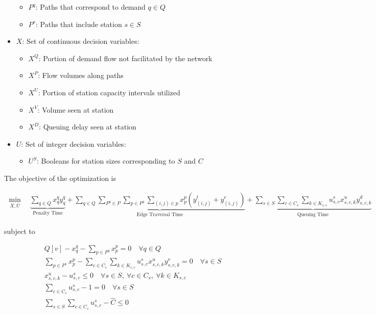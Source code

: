 \documentclass[12pt]{article}
\begin{document}
\begin{itemize}
\begin{itemize}
		\item $P^q$: Paths that correspond to demand $q \in Q$
		\item $P^s$: Paths that include station $s \in S$
	\end{itemize}
	\item $X$: Set of continuous decision variables: \begin{itemize}
		\item $X^Q$: Portion of demand flow not facilitated by the network
		\item $X^P$: Flow volumes along paths
		\item $X^U$: Portion of station capacity intervals utilized
		\item $X^V$: Volume seen at station
		\item $X^D$: Queuing delay seen at station
	\end{itemize}
	\item $U$: Set of integer decision variables: \begin{itemize}
		\item $U^S$: Booleans for station sizes corresponding to $S$ and $C$
	\end{itemize}
\end{itemize}


The objective of the optimization is

\begin{gather}
	\min_{\overline{X},\overline{U}}\quad \underbrace{\sum_{q \in Q} x^q_qy^q_q}_{\text{Penalty Time}} + \underbrace{\sum_{q \in Q}\sum_{P^q \in P}\sum_{p \in P^q}\sum_{(i, j) \in p} x^p_p(y^t_{(i, j)} + y^e_{(i, j)})}_{\text{Edge Traversal Time}} + \underbrace{\sum_{s \in S}\sum_{c \in C_s}
	\sum_{k \in K_{s, c}} u^s_{s, c}x^u_{s, c, k}y^d_{s, c, k}}_{\text{Queuing Time}} \label{eq:tm:obj}
\end{gather}

subject to

\begin{gather}
	Q[v] - x^q_q - \sum_{p \in P^q}x^p_p = 0 \quad \forall q \in Q \label{eq:tm:flow_dem} \\
	\sum_{p \in P^s} x^p_p - \sum_{c \in C_s}
	\sum_{k \in K_{s, c}} u^s_{s, c}x^u_{s, c, k}y^v_{s, c, k} = 0 \quad \forall s \in S \label{eq:tm:flow_cons} \\
	x^u_{s, c, k} - u^s_{s, c} \leq 0 \quad \forall s \in S, \ \forall c \in C_s,\ \forall k\in K_{s, c} \label{eq:tm:sz_int} \\
	\sum_{c \in C_s} u^s_{s, c} - 1 = 0 \quad \forall s \in S \label{eq:tm:chg_unity} \\
	\sum_{s \in S}\sum_{c \in C_s} u^s_{s, c} - \hat{C} \leq 0 \label{eq:tm:chg_tot}
\end{gather}
\end{document}
